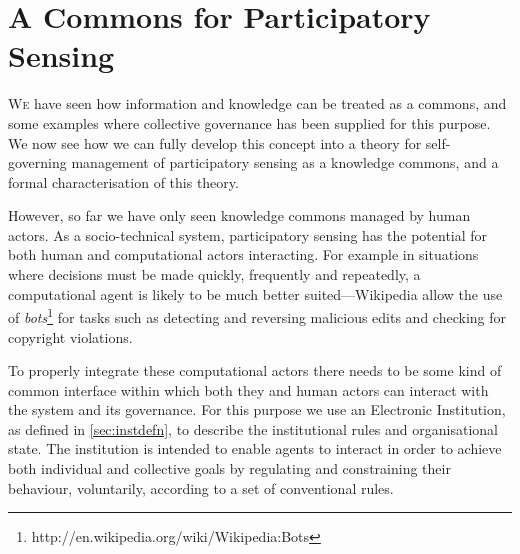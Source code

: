 

\acresetall
\chapter{A Commons for Participatory Sensing}\label{sec:iad}



\lettrine[lines=3]{W}{e} have seen how information and knowledge can be treated as a commons, and
some examples where collective governance has been supplied for this purpose.
We now see how we can fully develop this concept into a theory for self-
governing management of participatory sensing as a knowledge commons, and a
formal characterisation of this theory.

However, so far we have only seen knowledge commons managed by human actors.
As a socio-technical system, participatory sensing has the potential for both
human and computational actors interacting.  For example in situations where
decisions must be made quickly, frequently and repeatedly, a computational
agent is likely to be much better suited---Wikipedia allow the use of
\emph{bots}\footnote{http://en.wikipedia.org/wiki/Wikipedia:Bots} for tasks
such as detecting and reversing malicious edits and checking for copyright
violations.

To properly integrate these computational actors there needs to be
some kind of common interface within which both they and human actors can
interact with the system and its governance. For this purpose we use an
Electronic Institution, as defined in \autoref{sec:instdefn}, to describe the
institutional rules and organisational state. The institution is intended to
enable agents to interact in order to achieve both individual and collective
goals by regulating and constraining their behaviour, voluntarily, according
to a set of conventional rules.

